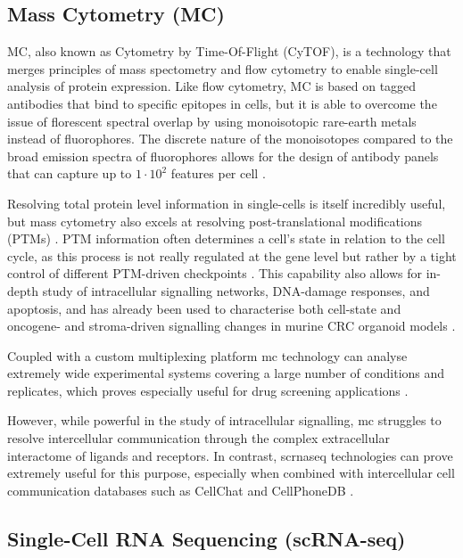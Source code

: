 \subsection{Mass Cytometry (MC)}

MC, also known as Cytometry by Time-Of-Flight (CyTOF), is a technology that merges principles of mass spectometry and flow cytometry to enable single-cell analysis of protein expression. Like flow cytometry, MC is based on tagged antibodies that bind to specific epitopes in cells, but it is able to overcome the issue of florescent spectral overlap by using monoisotopic rare-earth metals instead of fluorophores. The discrete nature of the monoisotopes compared to the broad emission spectra of fluorophores allows for the design of antibody panels that can capture up to \(1\cdot10^2\) features per cell \cite{tracey_cytof_2021}. 

Resolving total protein level information in single-cells is itself incredibly useful, but mass cytometry also excels at resolving post-translational modifications (PTMs) \cite{ochoa_functional_2019}. PTM information often determines a cell's state in relation to the cell cycle, as this process is not really regulated at the gene level but rather by a tight control of different PTM-driven checkpoints \cite{cuijpers_guiding_2018}. This capability also allows for in-depth study of intracellular signalling networks, DNA-damage responses, and apoptosis, and has already been used to characterise both cell-state and oncogene- and stroma-driven signalling changes in murine CRC organoid models \cite{qin_cell-type-specific_2020}.

Coupled with a custom multiplexing platform \cite{sufi_multiplexed_2021} \acrshort{mc} technology can analyse extremely wide experimental systems covering a large number of conditions and replicates, which proves especially useful for drug screening applications \cite{zapatero_trellis_2023}.

However, while powerful in the study of intracellular signalling, \acrlong{mc} struggles to resolve intercellular communication through the complex extracellular interactome of ligands and receptors. In contrast, \acrfull{scrnaseq} technologies can prove extremely useful for this purpose, especially when combined with intercellular cell communication databases such as CellChat \cite{jin_inference_2021} and CellPhoneDB \cite{efremova_cellphonedb_2020}.


\subsection{Single-Cell RNA Sequencing (scRNA-seq)}

